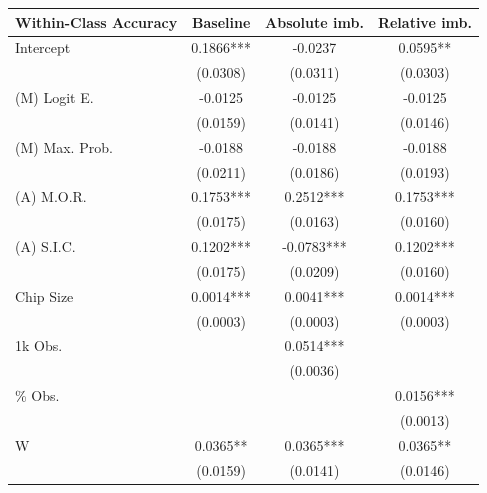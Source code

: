\begin{table}
\begin{tabular}{lccc}
\toprule
{Within-Class Accuracy}  & Baseline & Absolute imb. & Relative imb. \\
\midrule
Intercept                                         &   0.1866*** &     -0.0237 &    0.0595** \\
                                                  &    (0.0308) &    (0.0311) &    (0.0303) \\
(M) Logit E.                                      &     -0.0125 &     -0.0125 &     -0.0125 \\
                                                  &    (0.0159) &    (0.0141) &    (0.0146) \\
(M) Max. Prob.                                    &     -0.0188 &     -0.0188 &     -0.0188 \\
                                                  &    (0.0211) &    (0.0186) &    (0.0193) \\
(A) M.O.R.                                        &   0.1753*** &   0.2512*** &   0.1753*** \\
                                                  &    (0.0175) &    (0.0163) &    (0.0160) \\
(A) S.I.C.                                        &   0.1202*** &  -0.0783*** &   0.1202*** \\
                                                  &    (0.0175) &    (0.0209) &    (0.0160) \\
Chip Size                                         &   0.0014*** &   0.0041*** &   0.0014*** \\
                                                  &    (0.0003) &    (0.0003) &    (0.0003) \\
1k Obs.                                           &             &   0.0514*** &             \\
                                                  &             &    (0.0036) &             \\
\% Obs.                                           &             &             &   0.0156*** \\
                                                  &             &             &    (0.0013) \\
W                                                 &    0.0365** &   0.0365*** &    0.0365** \\
                                                  &    (0.0159) &    (0.0141) &    (0.0146) \\

\end{tabular}
\end{table}
